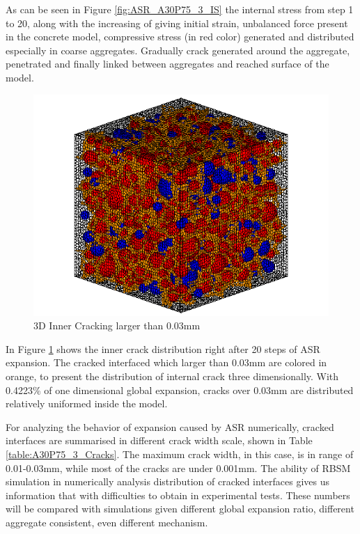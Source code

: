 As can be seen in Figure \ref{fig:ASR_A30P75_3_IS} the internal stress from step 1 to 20, along with the increasing of giving initial strain, unbalanced force present in the concrete model, compressive stress (in red color) generated and distributed especially in coarse aggregates. Gradually crack generated around the aggregate, penetrated and finally linked between aggregates and reached surface of the model.

\begin{figure}[ht!]
\centering
\includegraphics[width=.5\linewidth]{Files/exp_3D/ASR/A30P75_3_c.png}
  \caption{3D Inner Cracking larger than 0.03mm}
  \label{fig:A30P75_3_crack}
\end{figure}

In Figure \ref{fig:A30P75_3_crack} shows the inner crack distribution right after 20 steps of ASR expansion. The cracked interfaced which larger than 0.03mm are colored in orange, to present the distribution of internal crack three dimensionally. With 0.4223\% of one dimensional global expansion, cracks over 0.03mm are distributed relatively uniformed inside the model.

For analyzing the behavior of expansion caused by ASR numerically, cracked interfaces are summarised in different crack width scale, shown in Table \ref{table:A30P75_3_Cracks}. The maximum crack width, in this case, is in range of 0.01-0.03mm, while most of the cracks are under 0.001mm. The ability of RBSM simulation in numerically analysis distribution of cracked interfaces gives us information that with difficulties to obtain in experimental tests. These numbers will be compared with simulations given different global expansion ratio, different aggregate consistent, even different mechanism.

